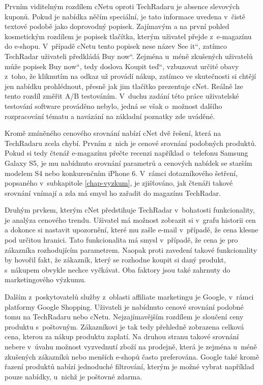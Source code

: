 \documentclass[12pt,twoside,openany]{fithesis}
\begin{document}
Prvním viditelným rozdílem cNetu oproti TechRadaru je absence slevových 
kuponů. Pokud je nabídka něčím speciální, je tato informace uvedena 
v~čistě textové podobě jako doprovodný popisek. Zajímavým a na první 
pohled kosmetickým rozdílem je popisek tlačítka, kterým uživatel přejde 
z~e-magazínu do e-shopu. V~případě cNetu tento popisek nese název \glqq 
See it\textquotedblleft{}, zatímco TechRadar uživateli předkládá \glqq Buy 
now\textquotedblleft{}. Zejména u~méně zkušených uživatelů může 
popisek \glqq Buy now\textquotedblleft{}, tedy doslova \glqq Koupit 
teď\textquotedblleft{}, vzbuzovat určité obavy z~toho, že kliknutím na 
odkaz už provádí nákup, zatímco ve skutečnosti si chtějí jen nabídku 
prohlédnout, přesně jak jim tlačítko prezentuje cNet. Reálně lze tento 
rozdíl změřit A/B testováním. \cite{ab-testing}{} V~duchu zadání této 
práce uživatelské testování software prováděno nebylo, jedná se však 
o~možnost dalšího rozpracování tématu a navázání na základní 
poznatky zde uváděné.

Kromě zmíněného cenového srovnání nabízí cNet dvě řešení, která 
na TechRadaru zcela chybí. Prvním z~nich je cenové srovnání podobných 
produktů. Pokud si tedy čtenář e-magazínu přečte recenzi například 
o~telefonu Samsung Galaxy S5, je mu nabídnuto srovnání parametrů a 
cenových nabídek se starším modelem S4 nebo konkurenčním iPhone 6. 
V~rámci dotazníkového šetření, popsaného v~subkapitole 
\hyperlink{chap-vyzkum}{{\ref{chap-vyzkum}}}, je zjišťováno, jak čtenáři 
takové srovnání vnímají a zda má smysl ho zařadit do magazínu TechRadar.

Druhým prvkem, kterým cNet předstihuje TechRadar v~bohatosti funkcionality, 
je analýza cenového trendu. Uživatel má možnost zobrazit si v~grafu 
historii cen a dokonce si nastavit upozornění, které mu zašle e-mail 
v~případě, že cena klesne pod určitou hranici. Tato funkcionalita má 
smysl v~případě, že cena je pro zákazníka rozhodujícím parametrem. 
Naopak proti zavedení takové funkcionality by hovořil fakt, že zákazník, 
který se rozhodne koupit si daný produkt, s~nákupem obvykle nechce 
vyčkávat. Oba faktory jsou také zahrnuty do marketingového výzkumu.

Dalším z~poskytovatelů služby z~oblasti affiliate marketingu je Google, 
v~rámci platformy Google Shopping. Uživateli je nabídnuto cenové srovnání 
podobné tomu na TechRadaru nebo cNetu. Nejzajímavějším rozdílem je 
sloučení ceny produktu s~poštovným. Zákazníkovi je tak tedy přehledně 
zobrazena celková cena, kterou za nákup produktu zaplatí. Na druhou stranu 
takové srovnání nebere v~úvahu možnost vyzvednutí zboží na prodejně, 
která je zejména u~méně zkušených zákazníků nebo menších e-shopů 
často preferována. Google také kromě řazení produktů nabízí 
jednoduché filtrování, kterým je možné vybrat například pouze nabídky, 
u~nichž je poštovné zdarma.
\end{document}

